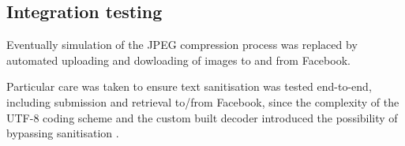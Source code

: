 \subsection{Integration testing}

Eventually simulation of the JPEG compression process was replaced by automated uploading and dowloading of images to and from Facebook.

Particular care was taken to ensure text sanitisation was tested end-to-end, including submission and retrieval to/from Facebook, since the complexity of the UTF-8 coding scheme and the custom built decoder introduced the possibility of bypassing sanitisation \cite{utf8}.
